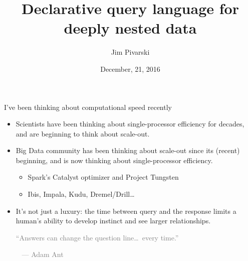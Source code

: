\documentclass{beamer}
\title[2016-12-21-femtocode-odg]{Declarative query language for deeply nested data}
\author{Jim Pivarski}
\institute{Princeton University -- DIANA}
\date{December, 21, 2016}
\begin{document}

\begin{frame}
  \titlepage
\end{frame}




\begin{frame}{I've been thinking about computational speed recently}
\vspace{0.5 cm}
\begin{itemize}\setlength{\itemsep}{0.25 cm}
\item Scientists have been thinking about single-processor efficiency for decades, and are beginning to think about scale-out.
\item Big Data community has been thinking about scale-out since its (recent) beginning, and is now thinking about single-processor efficiency.
\vspace{0.1 cm}
\begin{itemize}\setlength{\itemsep}{0.1 cm}
\item Spark's Catalyst optimizer and Project Tungsten
\item Ibis, Impala, Kudu, Dremel/Drill\ldots
\end{itemize}
\item It's not just a luxury: the time between query and the response limits a human's ability to develop instinct and see larger relationships.

\vspace{0.5 cm}
\textcolor{gray}{``Answers can change the question line\ldots\ every time.''}

\mbox{ } \hfill \textcolor{gray}{--- Adam Ant}
\end{itemize}
\end{frame}
\end{document}
